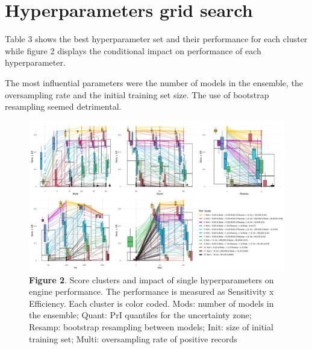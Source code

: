 \documentclass[
]{article}
\begin{document}
\hypertarget{hyperparameters-grid-search}{%
\section{Hyperparameters grid
search}\label{hyperparameters-grid-search}}

Table 3 shows the best hyperparameter set and their performance for each
cluster while figure 2 displays the conditional impact on performance of
each hyperparameter.

The most influential parameters were the number of models in the
ensemble, the oversampling rate and the initial training set size. The
use of bootstrap resampling seemed detrimental.

\begin{figure}
\centering
\includegraphics{S2.Additional_outputs_files/figure-latex/hyperparameters-1.pdf}
\caption{\textbf{Figure 2}. Score clusters and impact of single
hyperparameters on engine performance. The performance is measured as
Sensitivity x Efficiency. Each cluster is color coded. Mods: number of
models in the ensemble; Quant: PrI quantiles for the uncertainty zone;
Resamp: bootstrap resampling between models; Init: size of initial
training set; Multi: oversampling rate of positive records}
\end{figure}
\end{document}
